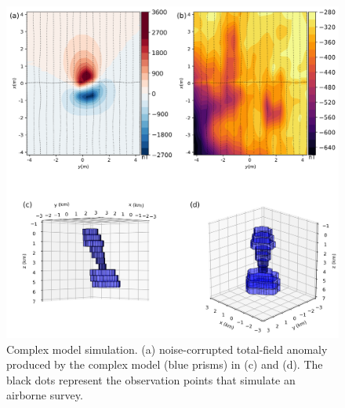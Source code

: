 \begin{figure}
    \centering
    \includegraphics[scale=.5]{figures/complex_model_data.png}
    \caption{Complex model simulation. (a) noise-corrupted total-field anomaly produced by the complex model (blue prisms) in (c) and (d). The black dots represent the observation points that simulate an airborne survey.
}
    \label{fig:complex_model}
\end{figure}

